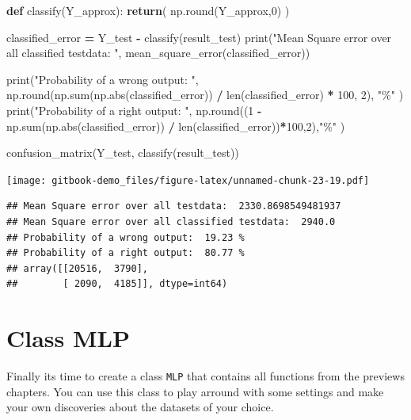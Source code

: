 \documentclass[
]{book}
\newenvironment{Shaded}{\begin{snugshade}}{\end{snugshade}}
\newcommand{\BuiltInTok}[1]{#1}
\newcommand{\ControlFlowTok}[1]{\textcolor[rgb]{0.13,0.29,0.53}{\textbf{#1}}}
\newcommand{\DecValTok}[1]{\textcolor[rgb]{0.00,0.00,0.81}{#1}}
\newcommand{\KeywordTok}[1]{\textcolor[rgb]{0.13,0.29,0.53}{\textbf{#1}}}
\newcommand{\NormalTok}[1]{#1}
\newcommand{\OperatorTok}[1]{\textcolor[rgb]{0.81,0.36,0.00}{\textbf{#1}}}
\newcommand{\StringTok}[1]{\textcolor[rgb]{0.31,0.60,0.02}{#1}}
\begin{document}
\begin{Shaded}
\begin{Highlighting}[]
\KeywordTok{def}\NormalTok{ classify(Y\_approx):}
  \ControlFlowTok{return}\NormalTok{( np.}\BuiltInTok{round}\NormalTok{(Y\_approx,}\DecValTok{0}\NormalTok{) )}

\NormalTok{classified\_error }\OperatorTok{=}\NormalTok{ Y\_test }\OperatorTok{{-}}\NormalTok{ classify(result\_test)}
\BuiltInTok{print}\NormalTok{(}\StringTok{"Mean Square error over all classified testdata: "}\NormalTok{, mean\_square\_error(classified\_error))}

\BuiltInTok{print}\NormalTok{(}\StringTok{"Probability of a wrong output: "}\NormalTok{, np.}\BuiltInTok{round}\NormalTok{(np.}\BuiltInTok{sum}\NormalTok{(np.}\BuiltInTok{abs}\NormalTok{(classified\_error)) }\OperatorTok{/} \BuiltInTok{len}\NormalTok{(classified\_error) }\OperatorTok{*} \DecValTok{100}\NormalTok{, }\DecValTok{2}\NormalTok{), }\StringTok{"\%"}\NormalTok{ )}
\BuiltInTok{print}\NormalTok{(}\StringTok{"Probability of a right output: "}\NormalTok{, np.}\BuiltInTok{round}\NormalTok{((}\DecValTok{1} \OperatorTok{{-}}\NormalTok{ np.}\BuiltInTok{sum}\NormalTok{(np.}\BuiltInTok{abs}\NormalTok{(classified\_error)) }\OperatorTok{/} \BuiltInTok{len}\NormalTok{(classified\_error))}\OperatorTok{*}\DecValTok{100}\NormalTok{,}\DecValTok{2}\NormalTok{),}\StringTok{"\%"}\NormalTok{ )}


\NormalTok{confusion\_matrix(Y\_test, classify(result\_test))}
\end{Highlighting}
\end{Shaded}

\texttt{[image: gitbook-demo\_files/figure-latex/unnamed-chunk-23-19.pdf]}

\begin{verbatim}
## Mean Square error over all testdata:  2330.8698549481937
## Mean Square error over all classified testdata:  2940.0
## Probability of a wrong output:  19.23 %
## Probability of a right output:  80.77 %
## array([[20516,  3790],
##        [ 2090,  4185]], dtype=int64)
\end{verbatim}

\hypertarget{class-mlp}{%
\chapter{Class MLP}\label{class-mlp}}

Finally its time to create a class \texttt{MLP} that contains all functions from the previews chapters. You can use this class to play arround with some settings and make your own discoveries about the datasets of your choice.
\end{document}
